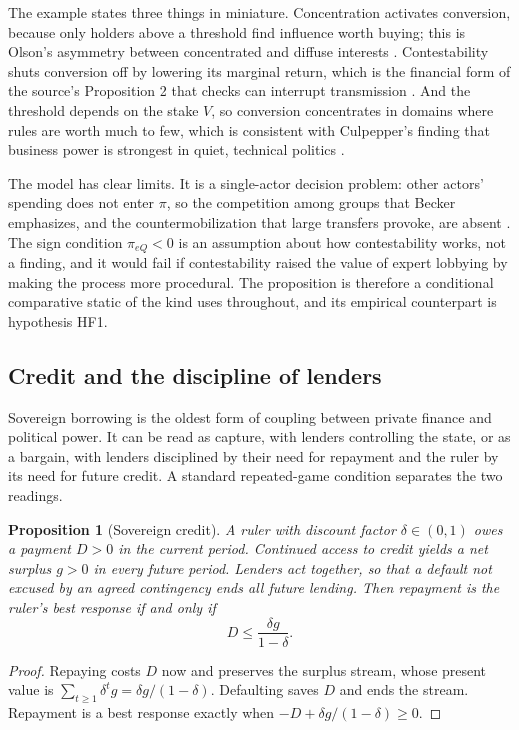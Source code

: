 \documentclass[11pt,letterpaper]{article}
\newtheorem{proposition}[theorem]{Proposition}
\theoremstyle{definition}
\theoremstyle{remark}
\begin{document}
The example states three things in miniature. Concentration activates conversion, because only holders above a threshold find influence worth buying; this is Olson's asymmetry between concentrated and diffuse interests \citep{olson1965}. Contestability shuts conversion off by lowering its marginal return, which is the financial form of the source's Proposition 2 that checks can interrupt transmission \citep{largo2026hbs}. And the threshold depends on the stake $V$, so conversion concentrates in domains where rules are worth much to few, which is consistent with Culpepper's finding that business power is strongest in quiet, technical politics \citep{culpepper2010}.

The model has clear limits. It is a single-actor decision problem: other actors' spending does not enter $\pi$, so the competition among groups that Becker emphasizes, and the countermobilization that large transfers provoke, are absent \citep{becker1983}. The sign condition $\pi_{eQ}<0$ is an assumption about how contestability works, not a finding, and it would fail if contestability raised the value of expert lobbying by making the process more procedural. The proposition is therefore a conditional comparative static of the kind \citet{largo2026hbs} uses throughout, and its empirical counterpart is hypothesis HF1.

\subsection{Credit and the discipline of lenders}

Sovereign borrowing is the oldest form of coupling between private finance and political power. It can be read as capture, with lenders controlling the state, or as a bargain, with lenders disciplined by their need for repayment and the ruler by its need for future credit. A standard repeated-game condition separates the two readings.

\begin{proposition}[Sovereign credit]
\label{prop:financial-power:sovereign-credit}
A ruler with discount factor $\delta\in(0,1)$ owes a payment $D>0$ in the current period. Continued access to credit yields a net surplus $g>0$ in every future period. Lenders act together, so that a default not excused by an agreed contingency ends all future lending. Then repayment is the ruler's best response if and only if
\[
D\leq\frac{\delta g}{1-\delta}.
\]
\end{proposition}

\begin{proof}
Repaying costs $D$ now and preserves the surplus stream, whose present value is $\sum_{t\geq 1}\delta^t g=\delta g/(1-\delta)$. Defaulting saves $D$ and ends the stream. Repayment is a best response exactly when $-D+\delta g/(1-\delta)\geq 0$.
\end{proof}
\end{document}
